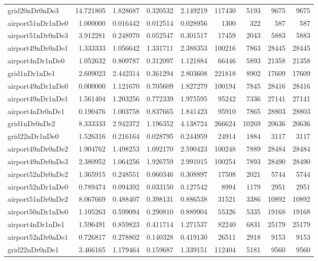 \begin{longtable}{|l|r|r|r|r|r|r|r|r|}
grid20nDr0nDe3 & 14.721805 & 1.828687 & 0.320532 & 2.149219 & 117430 & 5193 & 9675 & 9675 \\
airport51nDr1nDe0 & 1.000000 & 0.016442 & 0.012514 & 0.028956 & 1300 & 322 & 587 & 587 \\
airport51nDr0nDe3 & 3.912281 & 0.248970 & 0.052547 & 0.301517 & 17459 & 2043 & 5883 & 5883 \\
airport49nDr0nDe1 & 1.333333 & 1.056642 & 1.331711 & 2.388353 & 100216 & 7863 & 28445 & 28445 \\
airport4nDr1nDe0 & 1.052632 & 0.809787 & 0.312097 & 1.121884 & 66446 & 5893 & 21358 & 21358 \\
grid1nDr1nDe1 & 2.609023 & 2.442314 & 0.361294 & 2.803608 & 221818 & 8902 & 17609 & 17609 \\
airport49nDr1nDe0 & 0.000000 & 1.121670 & 0.705609 & 1.827279 & 100194 & 7845 & 28416 & 28416 \\
airport49nDr1nDe1 & 1.561404 & 1.203256 & 0.772339 & 1.975595 & 95242 & 7336 & 27141 & 27141 \\
airport4nDr0nDe1 & 0.190476 & 1.003758 & 0.837665 & 1.841423 & 95910 & 7865 & 28803 & 28803 \\
grid1nDr0nDe2 & 8.333333 & 2.942372 & 1.196352 & 4.138724 & 266624 & 10269 & 20636 & 20636 \\
grid22nDr1nDe0 & 1.526316 & 0.216164 & 0.028795 & 0.244959 & 24914 & 1884 & 3117 & 3117 \\
airport49nDr0nDe2 & 1.904762 & 1.498253 & 1.092170 & 2.590423 & 100248 & 7889 & 28484 & 28484 \\
airport49nDr0nDe3 & 2.380952 & 1.064256 & 1.926759 & 2.991015 & 100254 & 7893 & 28490 & 28490 \\
airport52nDr0nDe2 & 1.365915 & 0.248551 & 0.060346 & 0.308897 & 17508 & 2021 & 5744 & 5744 \\
airport52nDr1nDe0 & 0.789474 & 0.094392 & 0.033150 & 0.127542 & 8994 & 1179 & 2951 & 2951 \\
airport51nDr0nDe2 & 8.067669 & 0.488407 & 0.398131 & 0.886538 & 31521 & 3386 & 10892 & 10892 \\
airport50nDr1nDe0 & 1.105263 & 0.599094 & 0.290810 & 0.889904 & 55326 & 5335 & 19168 & 19168 \\
airport4nDr1nDe1 & 1.596491 & 0.859823 & 0.411714 & 1.271537 & 82240 & 6831 & 25179 & 25179 \\
airport52nDr0nDe1 & 0.726817 & 0.278802 & 0.140328 & 0.419130 & 26511 & 2918 & 9153 & 9153 \\
grid22nDr0nDe1 & 3.466165 & 1.179464 & 0.159687 & 1.339151 & 112404 & 5181 & 9560 & 9560 \\

\end{longtable}
